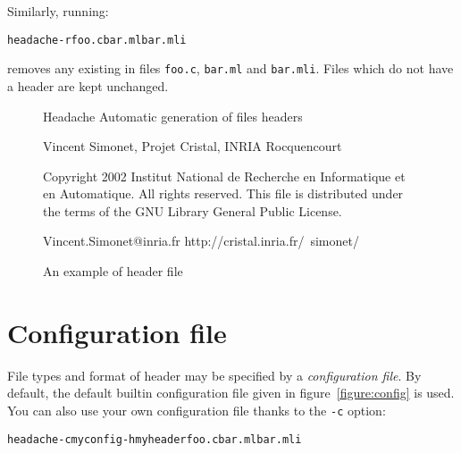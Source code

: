 \documentclass{vs-article}
\begin{document}
Similarly, running:
\begin{alltt}
  headache -r foo.c bar.ml bar.mli
\end{alltt}
removes any existing in files \verb+foo.c+, \verb+bar.ml+ and
\verb+bar.mli+.  Files which do not have a header are kept unchanged.

\begin{figure}
\begin{center}
\begin{boxedverbatim}
                             Headache
               Automatic generation of files headers

        Vincent Simonet, Projet Cristal, INRIA Rocquencourt

Copyright 2002 
Institut National de Recherche en Informatique et en Automatique.
All rights reserved.  This file is distributed under the terms of
the GNU Library General Public License.

Vincent.Simonet@inria.fr           http://cristal.inria.fr/~simonet/
\end{boxedverbatim}
\end{center}
  \caption{An example of header file}
  \label{figure:header}
\end{figure}



\section{Configuration file}

File types and format of header may be specified by a
\emph{configuration file}.  By default, the default builtin
configuration file given in figure~\ref{figure:config} is used.  You
can also use your own configuration file thanks to the \verb+-c+
option:
\begin{alltt}
  headache -c myconfig -h myheader foo.c bar.ml bar.mli
\end{alltt}
\end{document}

